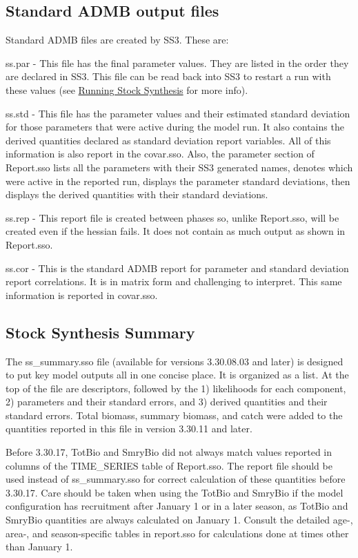 \subsection{Standard ADMB output files}
Standard ADMB files are created by SS3. These are:

ss.par - This file has the final parameter values.  They are listed in the order they are declared in SS3.  This file can be read back into SS3 to restart a run with these values (see \hyperref[sec:RunningSS]{Running Stock Synthesis} for more info).

ss.std - This file has the parameter values and their estimated standard deviation for those parameters that were active during the model run.  It also contains the derived quantities declared as standard deviation report variables.  All of this information is also report in the covar.sso.  Also, the parameter section of Report.sso lists all the parameters with their SS3 generated names, denotes which were active in the reported run, displays the parameter standard deviations, then displays the derived quantities with their standard deviations.

ss.rep - This report file is created between phases so, unlike Report.sso, will be created even if the hessian fails. It does not contain as much output as shown in Report.sso.

ss.cor - This is the standard ADMB report for parameter and standard deviation report correlations. It is in matrix form and challenging to interpret.  This same information is reported in covar.sso.

\subsection{Stock Synthesis Summary}
The ss\_summary.sso file (available for versions 3.30.08.03 and later) is designed to put key model outputs all in one concise place.  It is organized as a list. At the top of the file are descriptors, followed by the 1) likelihoods for each component, 2) parameters and their standard errors, and 3) derived quantities and their standard errors.  Total biomass, summary biomass, and catch were added to the quantities reported in this file in version 3.30.11 and later.

Before 3.30.17, TotBio and SmryBio did not always match values reported in columns of the TIME\_SERIES table of Report.sso. The report file should be used instead of ss\_summary.sso for correct calculation of these quantities before 3.30.17. Care should be taken when using the TotBio and SmryBio if the model configuration has recruitment after January 1 or in a later season, as TotBio and SmryBio quantities are always calculated on January 1. Consult the detailed age-, area-, and season-specific tables in report.sso for calculations done at times other than January 1.


